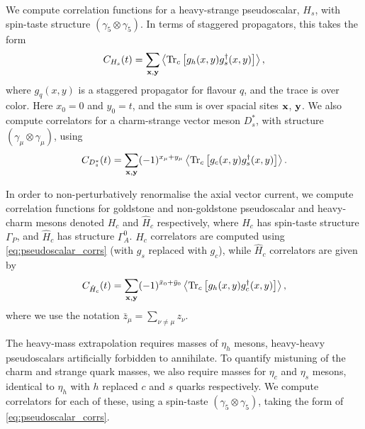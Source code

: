 We compute correlation functions for a heavy-strange pseudoscalar, $H_s$, with spin-taste structure $(\gamma_5\otimes \gamma_5)$. In terms of staggered propagators, this takes the form
\begin{align}
  C_{H_s}(t) = \sum_{\bf{x},\bf{y}} \left\langle \text{Tr}_c\left[ g_h(x,y) g_s^{\dagger}(x,y) \right] \right\rangle,
  \label{eq:pseudoscalar_corrs}
\end{align}
where $g_q(x,y)$ is a staggered propagator for flavour $q$, and the trace is over color. Here $x_0=0$ and $y_0=t$, and the sum is over spacial sites {$\bf{x}$, $\bf{y}$}. We also compute correlators for a charm-strange vector meson $D_s^*$, with structure $(\gamma_{\mu}\otimes \gamma_{\mu})$, using
\begin{align}
  C_{D_s^*}(t) = \sum_{\bf{x},\bf{y}} (-1)^{x_{\mu}+y_{\mu}} \left\langle \text{Tr}_c\left[ g_c(x,y) g_s^{\dagger}(x,y) \right] \right\rangle.
\end{align}

In order to non-perturbatively renormalise the axial vector current, we compute correlation functions for goldstone and non-goldstone pseudoscalar and heavy-charm mesons denoted $H_c$ and $\hat{H}_c$ respectively, where $H_c$ has spin-taste structure $\Gamma_P$, and $\hat{H}_c$ has structure $\Gamma^0_A$. $H_c$ correlators are computed using \eqref{eq:pseudoscalar_corrs} (with $g_s$ replaced with $g_c$), while $\hat{H}_c$ correlators are given by
\begin{align}
  C_{\hat{H}_c}(t) = \sum_{\bf{x},\bf{y}}(-1)^{\bar{x}_0+\bar{y}_0} \left\langle \text{Tr}_c\left[ g_h(x,y) g^{\dagger}_c(x,y) \right] \right\rangle,
\end{align}
where we use the notation $\bar{z}_{\mu} = \sum_{\nu\neq\mu} z_{\nu}$.

The heavy-mass extrapolation requires masses of $\eta_h$ mesons, heavy-heavy pseudoscalars artificially forbidden to annihilate. To quantify mistuning of the charm and strange quark masses, we also require masses for $\eta_c$ and $\eta_s$ mesons, identical to $\eta_h$ with $h$ replaced $c$ and $s$ quarks respectively. We compute correlators for each of these, using a spin-taste $(\gamma_5\otimes \gamma_5)$, taking the form of \eqref{eq:pseudoscalar_corrs}.

